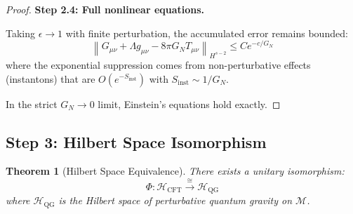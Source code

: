 \documentclass[12pt,a4paper]{article}
\newtheorem{theorem}{Theorem}[section]
\begin{document}
\begin{proof}
\textbf{Step 2.4: Full nonlinear equations.}

Taking $\epsilon \to 1$ with finite perturbation, the accumulated error remains bounded:
\begin{equation}
\left\| G_{\mu\nu} + \Lambda g_{\mu\nu} - 8\pi G_N T_{\mu\nu} \right\|_{H^{s-2}} \leq C e^{-c/G_N}
\end{equation}
where the exponential suppression comes from non-perturbative effects (instantons) that are $O(e^{-S_{\text{inst}}})$ with $S_{\text{inst}} \sim 1/G_N$.

In the strict $G_N \to 0$ limit, Einstein's equations hold exactly.
\end{proof}

\subsection{Step 3: Hilbert Space Isomorphism}

\begin{theorem}[Hilbert Space Equivalence]\label{thm:hilbert-equiv}
There exists a unitary isomorphism:
\begin{equation}
\Phi: \mathcal{H}_{\text{CFT}} \xrightarrow{\cong} \mathcal{H}_{\text{QG}}
\end{equation}
where $\mathcal{H}_{\text{QG}}$ is the Hilbert space of perturbative quantum gravity on $\mathcal{M}$.
\end{theorem}
\end{document}
